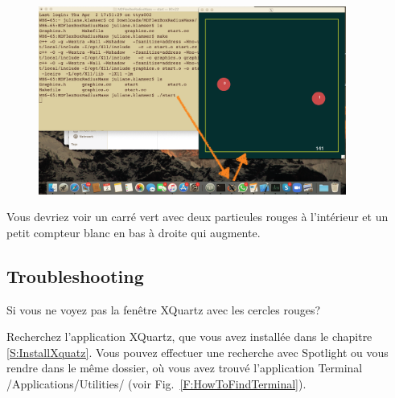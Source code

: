 \documentclass{article}
\newcommand\fig[1]{{Fig.~\ref{#1}}}
\begin{document}
\begin{figure}[H]
\center
\includegraphics[width=0.9\textwidth]{Plots/MD_4XQuartz.png}
\end{figure}
Vous devriez voir un carré vert avec deux particules rouges à l'intérieur et un petit compteur blanc en bas à droite qui augmente.
\subsection{Troubleshooting}
Si vous ne voyez pas la fenêtre XQuartz avec les cercles rouges?

Recherchez l'application XQuartz, que vous avez installée dans le chapitre \ref{S:InstallXquatz}. Vous pouvez effectuer une recherche avec Spotlight ou vous rendre dans le même dossier, où vous avez trouvé l'application Terminal /Applications/Utilities/ (voir \fig{F:HowToFindTerminal}). 
\end{document}

